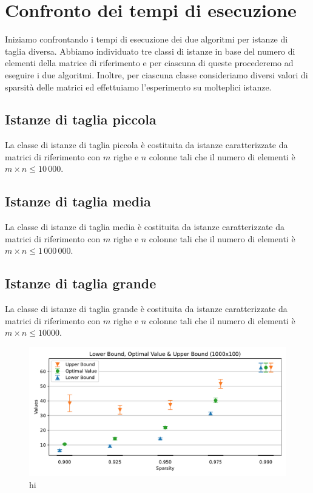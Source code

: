 \section{Confronto dei tempi di esecuzione}

Iniziamo confrontando i tempi di esecuzione dei due algoritmi per istanze di taglia diversa. Abbiamo individuato tre
classi di istanze in base del numero di elementi della matrice di riferimento e per ciascuna di queste procederemo
ad eseguire i due algoritmi. Inoltre, per ciascuna classe consideriamo diversi valori di sparsità delle matrici ed effettuiamo
l'esperimento su molteplici istanze.

\subsection{Istanze di taglia piccola}
La classe di istanze di taglia piccola è costituita da istanze caratterizzate da matrici di riferimento con \( m \)
righe e
\(
    n
\)
colonne tali che il numero di elementi è \( m\times n \leq 10\,000 \).

\subsection{Istanze di taglia media}
La classe di istanze di taglia media è costituita da istanze caratterizzate da matrici di riferimento con \( m \)
righe e
\(
    n
\)
colonne tali che il numero di elementi è \( m\times n \leq 1\,000\,000 \).

\subsection{Istanze di taglia grande}
La classe di istanze di taglia grande è costituita da istanze caratterizzate da matrici di riferimento con \( m \)
righe e
\(
    n
\)
colonne tali che il numero di elementi è \( m\times n \leq 10000 \).


\newpage
\begin{figure}[h]
    \centering
    \includegraphics[scale=.787]{assets/figures/Figure_15.pdf}
    \caption{hi}
\end{figure}


